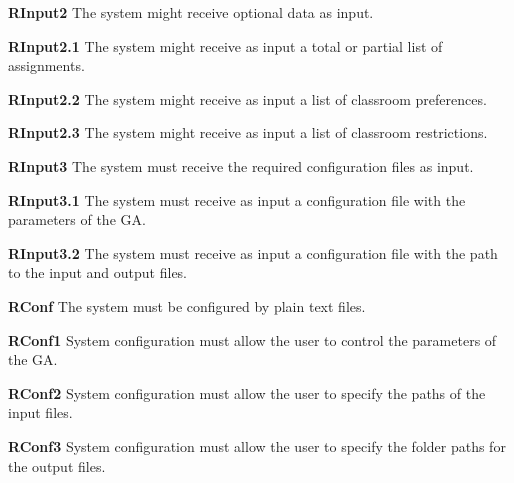 \begin{description}
    \item \textbf{RInput2} The system might receive optional data as input.
        \begin{description}
            \item \textbf{RInput2.1} The system might receive as input a total or partial list of assignments.
            \item \textbf{RInput2.2} The system might receive as input a list of classroom preferences.
            \item \textbf{RInput2.3} The system might receive as input a list of classroom restrictions.
        \end{description}

    \item \textbf{RInput3} The system must receive the required configuration files as input.
        \begin{description}
            \item \textbf{RInput3.1} The system must receive as input a configuration file with the parameters of the GA.
            \item \textbf{RInput3.2} The system must receive as input a configuration file with the path to the input and output files.
        \end{description}

    \item \textbf{RConf} The system must be configured by plain text files.
        \begin{description}
            \item \textbf{RConf1} System configuration must allow the user to control the parameters of the GA.
            \item \textbf{RConf2} System configuration must allow the user to specify the paths of the input files.
            \item \textbf{RConf3} System configuration must allow the user to specify the folder paths for the output files.
        \end{description}


\end{description}

